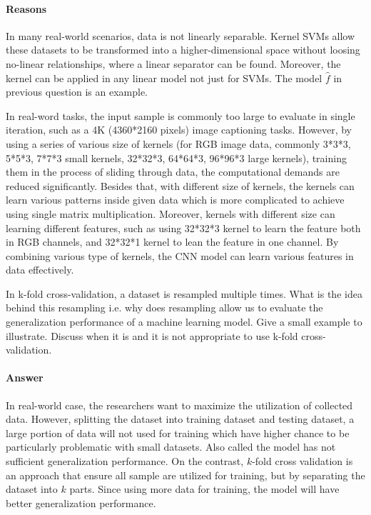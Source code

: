 \paragraph{Reasons}
In many real-world scenarios, data is not linearly separable. 
Kernel SVMs allow these datasets to be transformed 
into a higher-dimensional space without loosing no-linear relationships,
where a linear separator can be found. 
Moreover, the kernel can be applied in any linear model not just for SVMs.
The model $\widehat{f}$ in previous question is an example.

In real-word tasks, the input sample is commonly too large to evaluate 
in single iteration, such as a 4K (4360*2160 pixels) image captioning tasks.
However, by using a series of various size of kernels 
(for RGB image data, commonly 3*3*3, 5*5*3, 7*7*3 small kernels, 
32*32*3, 64*64*3, 96*96*3 large kernels), training them in the process of 
sliding through data, the computational demands are reduced significantly.
Besides that, with different size of kernels, the kernels can learn 
various patterns inside given data which is more complicated to achieve using 
single matrix multiplication. 
Moreover, kernels with different size can learning different features, such 
as using 32*32*3 kernel to learn the feature both in RGB channels, and 
32*32*1 kernel to lean the feature in one channel. 
By combining various type of kernels, the CNN model can learn 
various features in data effectively.

\vspace{1em}
\thequestion In k-fold cross-validation, a dataset is resampled multiple times. What is the idea behind
this resampling i.e. why does resampling allow us to evaluate the generalization
performance of a machine learning model. Give a small example to illustrate. Discuss
when it is and it is not appropriate to use k-fold cross-validation.

\paragraph{Answer}
In real-world case, the researchers want to maximize the utilization of 
collected data. 
However, splitting the dataset into training dataset and testing dataset,
a large portion of data will not used for training which 
have higher chance to be particularly problematic with small datasets. 
Also called the model has not sufficient generalization performance.
On the contrast, $k$-fold cross validation is an approach that 
ensure all sample are utilized for training, but by separating the dataset into 
$k$ parts. 
Since using more data for training, the model will have better generalization
performance.

